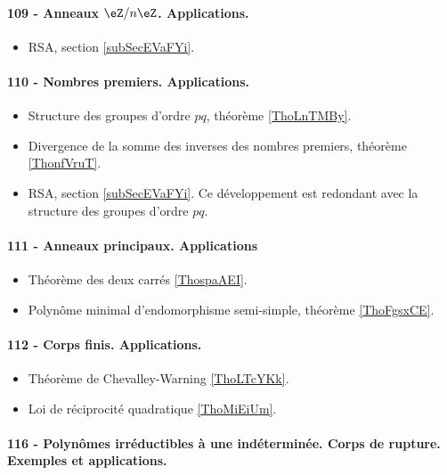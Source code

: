 \paragraph{109 - Anneaux $\eZ/n\eZ$. Applications.}
\begin{itemize}
    \item RSA, section \ref{subSecEVaFYi}.
\end{itemize}

\paragraph{110 - Nombres premiers. Applications.}
\begin{itemize}
    \item Structure des groupes d'ordre \( pq\), théorème \ref{ThoLnTMBy}.
    \item Divergence de la somme des inverses des nombres premiers, théorème \ref{ThonfVruT}.
    \item RSA, section \ref{subSecEVaFYi}. Ce développement est redondant avec la structure des groupes d'ordre \( pq\).
\end{itemize}

\paragraph{111 - Anneaux principaux. Applications}
\begin{itemize}
    \item Théorème des deux carrés \ref{ThospaAEI}.
    \item Polynôme minimal d'endomorphisme semi-simple, théorème \ref{ThoFgsxCE}.
\end{itemize}

\paragraph{112 - Corps finis. Applications.}
\begin{itemize}
    \item Théorème de Chevalley-Warning \ref{ThoLTcYKk}.
    \item Loi de réciprocité quadratique \ref{ThoMiEiUm}.
\end{itemize}

\paragraph{116 - Polynômes irréductibles à une indéterminée. Corps de rupture. Exemples et applications.}
